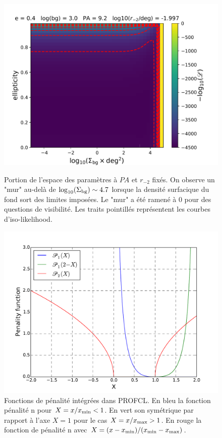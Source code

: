 \documentclass[a4paper,11pt]{article}
\numberwithin{equation}{section}
\begin{document}
    \begin{figure}
      \begin{minipage}[t]{0.48\textwidth}
      \vspace{0pt}

      \includegraphics[width=\linewidth]{fixedPA_and_loga.pdf}
  		\caption{Portion de l'espace des paramètres à $PA$ et $r_{-2}$ fixés. On observe un "mur" au-delà de $\log_{10}(\Sigma_{\rm{bg}}) \sim 4.7$ lorsque la densité surfacique du fond sort des limites imposées. Le "mur" a été ramené à 0 pour des questions de visibilité. Les traits pointillés représentent les courbes d'iso-likelihood.}	  
  		\label{fig:Wall}
  	  \end{minipage}
	  \hfill
    \begin{minipage}[t]{0.48\textwidth}
      \vspace{0pt}
      \includegraphics[width=\linewidth]{penalty.pdf}
  		\caption{Fonctions de pénalité intégrées dans PROFCL. En bleu la fonction pénalité n pour $X = x/x_{\rm{min}} < 1 $. En vert son symétrique par rapport à l'axe $X=1$ pour le cas $X = x/x_{\rm{max}} > 1$. En rouge la fonction de pénalité n avec $X = (x - x_{\rm{min}})/(x_{\rm{min}} - x_{\rm{max}})$.}
  	\end{minipage}
  	

\end{figure}
\end{document}
